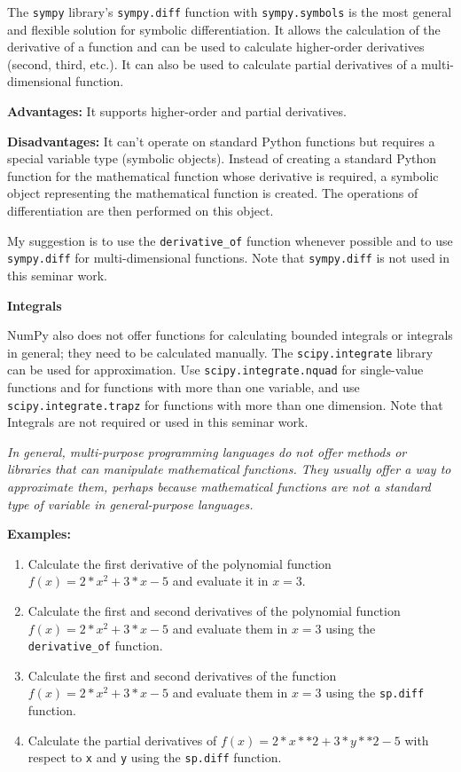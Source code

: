\documentclass[11pt]{article}
\begin{document}
The \texttt{sympy} library's \texttt{sympy.diff} function with
\texttt{sympy.symbols} is the most general and flexible solution for
symbolic differentiation. It allows the calculation of the derivative of
a function and can be used to calculate higher-order derivatives
(second, third, etc.). It can also be used to calculate partial
derivatives of a multi-dimensional function.

\textbf{Advantages:} It supports higher-order and partial derivatives.

\textbf{Disadvantages:} It can't operate on standard Python functions
but requires a special variable type (symbolic objects). Instead of
creating a standard Python function for the mathematical function whose
derivative is required, a symbolic object representing the mathematical
function is created. The operations of differentiation are then
performed on this object.

My suggestion is to use the \texttt{derivative\_of} function whenever
possible and to use \texttt{sympy.diff} for multi-dimensional functions.
Note that \texttt{sympy.diff} is not used in this seminar work.

\textbf{Integrals}

NumPy also does not offer functions for calculating bounded integrals or
integrals in general; they need to be calculated manually. The
\texttt{scipy.integrate} library can be used for approximation. Use
\texttt{scipy.integrate.nquad} for single-value functions and for
functions with more than one variable, and use
\texttt{scipy.integrate.trapz} for functions with more than one
dimension. Note that Integrals are not required or used in this seminar
work.

\emph{In general, multi-purpose programming languages do not offer
methods or libraries that can manipulate mathematical functions. They
usually offer a way to approximate them, perhaps because mathematical
functions are not a standard type of variable in general-purpose
languages.}

\textbf{Examples:}

\begin{enumerate}
\def\labelenumi{\arabic{enumi}.}
\item
  Calculate the first derivative of the polynomial function
  \(f(x) = 2*x^2 + 3*x -5\) and evaluate it in \(x = 3\).
\item
  Calculate the first and second derivatives of the polynomial function
  \(f(x) = 2*x^2 + 3*x -5\) and evaluate them in \(x = 3\) using the
  \texttt{derivative\_of} function.
\item
  Calculate the first and second derivatives of the function
  \(f(x) = 2*x^2 + 3*x -5\) and evaluate them in \(x = 3\) using the
  \texttt{sp.diff} function.
\item
  Calculate the partial derivatives of
  \(f(x) = 2 * x**2 + 3 * y**2 - 5\) with respect to \texttt{x} and
  \texttt{y} using the \texttt{sp.diff} function.
\end{enumerate}
\end{document}
